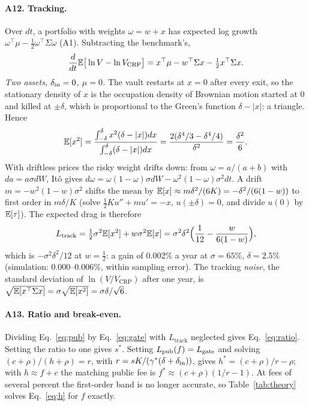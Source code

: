 \paragraph{A12. Tracking.} Over $dt$, a portfolio with weights $\omega=w+x$ has expected log growth $\omega^{\top}\mu-\tfrac12\omega^{\top}\Sigma\omega$ (A1). Subtracting the benchmark's,
\begin{equation}
\frac{d}{dt}\mathbb{E}\big[\ln V-\ln V_{\mathrm{CRP}}\big]=x^{\top}\mu-w^{\top}\Sigma x-\tfrac12x^{\top}\Sigma x .
\end{equation}
\emph{Two assets, $\delta_{\mathrm{in}}=0$, $\mu=0$.} The vault restarts at $x=0$ after every exit, so the stationary density of $x$ is the occupation density of Brownian motion started at 0 and killed at $\pm\delta$, which is proportional to the Green's function $\delta-|x|$: a triangle. Hence
\begin{equation}
\mathbb{E}[x^2]=\frac{\int_{-\delta}^{\delta}x^2(\delta-|x|)dx}{\int_{-\delta}^{\delta}(\delta-|x|)dx}=\frac{2(\delta^4/3-\delta^4/4)}{\delta^2}=\frac{\delta^2}{6}.
\end{equation}
With driftless prices the risky weight drifts down: from $\omega=a/(a+b)$ with $da=a\sigma dW$, It\^o gives $d\omega=\omega(1-\omega)\sigma dW-\omega^2(1-\omega)\sigma^2dt$. A drift $m=-w^2(1-w)\sigma^2$ shifts the mean by $\mathbb{E}[x]\approx m\delta^2/(6K)=-\delta^2/(6(1-w))$ to first order in $m\delta/K$ (solve $\tfrac12Ku''+mu'=-x$, $u(\pm\delta)=0$, and divide $u(0)$ by $\mathbb{E}[\tau]$). The expected drag is therefore
\begin{equation}
L_{\mathrm{track}}=\tfrac12\sigma^2\mathbb{E}[x^2]+w\sigma^2\mathbb{E}[x]=\sigma^2\delta^2\Big(\frac1{12}-\frac{w}{6(1-w)}\Big),
\end{equation}
which is $-\sigma^2\delta^2/12$ at $w=\tfrac12$: a gain of 0.002\% a year at $\sigma=65\%$, $\delta=2.5\%$ (simulation: 0.000--0.006\%, within sampling error). The tracking \emph{noise}, the standard deviation of $\ln(V/V_{\mathrm{CRP}})$ after one year, is $\sqrt{\mathbb{E}[x^{\top}\Sigma x]}=\sigma\sqrt{\mathbb{E}[x^2]}=\sigma\delta/\sqrt6$.

\paragraph{A13. Ratio and break-even.} Dividing Eq.~\eqref{eq:pub} by Eq.~\eqref{eq:gate} with $L_{\mathrm{track}}$ neglected gives Eq.~\eqref{eq:ratio}. Setting the ratio to one gives $s^{*}$. Setting $L_{\mathrm{pub}}(f)=L_{\mathrm{gate}}$ and solving $(c+\rho)/(h+\rho)=r$, with $r=sK/(\gamma^{*}(\delta+\delta_{\mathrm{in}}))$, gives $h^{*}=(c+\rho)/r-\rho$; with $h\approx f+c$ the matching public fee is $f^{*}\approx(c+\rho)(1/r-1)$. At fees of several percent the first-order band is no longer accurate, so Table~\ref{tab:theory} solves Eq.~\eqref{eq:h} for $f$ exactly.

